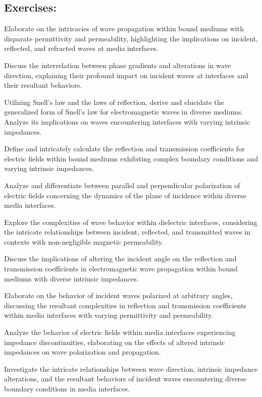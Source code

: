 \begin{mdframed}[ backgroundcolor=lightblue, linewidth=1pt, hidealllines=true]
\section{Exercises:}
\begin{ExerciseList}
    \Exercise[label={ex11}]
    Elaborate on the intricacies of wave propagation within bound mediums with disparate permittivity and permeability, highlighting the implications on incident, reflected, and refracted waves at media interfaces.
    
    \Exercise[label={ex11}]
    Discuss the interrelation between phase gradients and alterations in wave direction, explaining their profound impact on incident waves at interfaces and their resultant behaviors.
    
    \Exercise[label={ex11}]
    Utilizing Snell's law and the laws of reflection, derive and elucidate the generalized form of Snell's law for electromagnetic waves in diverse mediums. Analyze its implications on waves encountering interfaces with varying intrinsic impedances.
    
    \Exercise[label={ex11}]
    Define and intricately calculate the reflection and transmission coefficients for electric fields within bound mediums exhibiting complex boundary conditions and varying intrinsic impedances.
    
    \Exercise[label={ex11}]
    Analyze and differentiate between parallel and perpendicular polarization of electric fields concerning the dynamics of the plane of incidence within diverse media interfaces.
    
    \Exercise[label={ex11}]
    Explore the complexities of wave behavior within dielectric interfaces, considering the intricate relationships between incident, reflected, and transmitted waves in contexts with non-negligible magnetic permeability.
    
    \Exercise[label={ex11}]
    Discuss the implications of altering the incident angle on the reflection and transmission coefficients in electromagnetic wave propagation within bound mediums with diverse intrinsic impedances.
    
    \Exercise[label={ex11}]
    Elaborate on the behavior of incident waves polarized at arbitrary angles, discussing the resultant complexities in reflection and transmission coefficients within media interfaces with varying permittivity and permeability.
    
    \Exercise[label={ex11}]
    Analyze the behavior of electric fields within media interfaces experiencing impedance discontinuities, elaborating on the effects of altered intrinsic impedances on wave polarization and propagation.
    
    \Exercise[label={ex11}]
    Investigate the intricate relationships between wave direction, intrinsic impedance alterations, and the resultant behaviors of incident waves encountering diverse boundary conditions in media interfaces.
\end{ExerciseList}
\end{mdframed}